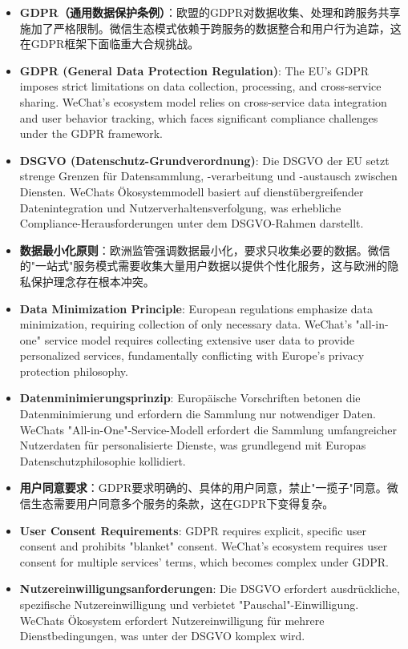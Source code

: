 \documentclass[11pt,a4paper]{article}
\begin{document}
\begin{itemize}
    \item \textbf{GDPR（通用数据保护条例）}：欧盟的GDPR对数据收集、处理和跨服务共享施加了严格限制。微信生态模式依赖于跨服务的数据整合和用户行为追踪，这在GDPR框架下面临重大合规挑战。
    \item \textbf{GDPR (General Data Protection Regulation)}: The EU's GDPR imposes strict limitations on data collection, processing, and cross-service sharing. WeChat's ecosystem model relies on cross-service data integration and user behavior tracking, which faces significant compliance challenges under the GDPR framework.
    \item \textbf{DSGVO (Datenschutz-Grundverordnung)}: Die DSGVO der EU setzt strenge Grenzen für Datensammlung, -verarbeitung und -austausch zwischen Diensten. WeChats Ökosystemmodell basiert auf dienstübergreifender Datenintegration und Nutzerverhaltensverfolgung, was erhebliche Compliance-Herausforderungen unter dem DSGVO-Rahmen darstellt.
    
    \item \textbf{数据最小化原则}：欧洲监管强调数据最小化，要求只收集必要的数据。微信的"一站式"服务模式需要收集大量用户数据以提供个性化服务，这与欧洲的隐私保护理念存在根本冲突。
    \item \textbf{Data Minimization Principle}: European regulations emphasize data minimization, requiring collection of only necessary data. WeChat's "all-in-one" service model requires collecting extensive user data to provide personalized services, fundamentally conflicting with Europe's privacy protection philosophy.
    \item \textbf{Datenminimierungsprinzip}: Europäische Vorschriften betonen die Datenminimierung und erfordern die Sammlung nur notwendiger Daten. WeChats "All-in-One"-Service-Modell erfordert die Sammlung umfangreicher Nutzerdaten für personalisierte Dienste, was grundlegend mit Europas Datenschutzphilosophie kollidiert.
    
    \item \textbf{用户同意要求}：GDPR要求明确的、具体的用户同意，禁止"一揽子"同意。微信生态需要用户同意多个服务的条款，这在GDPR下变得复杂。
    \item \textbf{User Consent Requirements}: GDPR requires explicit, specific user consent and prohibits "blanket" consent. WeChat's ecosystem requires user consent for multiple services' terms, which becomes complex under GDPR.
    \item \textbf{Nutzereinwilligungsanforderungen}: Die DSGVO erfordert ausdrückliche, spezifische Nutzereinwilligung und verbietet "Pauschal"-Einwilligung. WeChats Ökosystem erfordert Nutzereinwilligung für mehrere Dienstbedingungen, was unter der DSGVO komplex wird.
\end{itemize}
\end{document}

